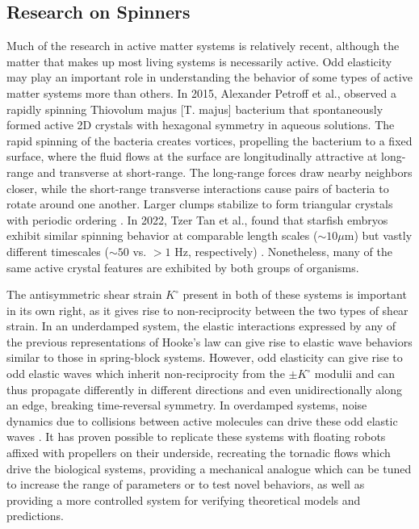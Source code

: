 \subsection*{Research on Spinners}
Much of the research in active matter systems is relatively recent, although the matter that makes up most living systems is necessarily active.  Odd elasticity may play an important role in understanding the behavior of some types of active matter systems more than others.  In 2015, Alexander Petroff et al., observed a rapidly spinning Thiovolum majus [T. majus] bacterium that spontaneously formed active 2D crystals with hexagonal symmetry in aqueous solutions.  The rapid spinning of the bacteria creates vortices, propelling the bacterium to a fixed surface, where the fluid flows at the surface are longitudinally attractive at long-range and transverse at short-range.  The long-range forces draw nearby neighbors closer, while the short-range transverse interactions cause pairs of bacteria to rotate around one another.  Larger clumps stabilize to form triangular crystals with periodic ordering \cite{petroff2015fast}.  In 2022, Tzer Tan et al., found that starfish embryos exhibit similar spinning behavior at comparable length scales ($\sim 10 \mu$m) but vastly different timescales ($\sim 50$ vs. $>1$ Hz, respectively) \cite{petroff2015fast, tan2022odd}.  Nonetheless, many of the same active crystal features are exhibited by both groups of organisms.

The antisymmetric shear strain $K^\circ$ present in both of these systems is important in its own right, as it gives rise to non-reciprocity between the two types of shear strain.  In an underdamped system, the elastic interactions expressed by any of the previous representations of Hooke's law can give rise to elastic wave behaviors similar to those in spring-block systems\cite{Shankar2019prx, tan2022odd, bililign2022motile, huang2025anomalous}.  However, odd elasticity can give rise to odd elastic waves which inherit non-reciprocity from the $\pm K^\circ$ modulii and can thus propagate differently in different directions and even unidirectionally along an edge, breaking time-reversal symmetry.  In overdamped systems, noise dynamics due to collisions between active molecules can drive these odd elastic waves \cite{choi2024noise}.  It has proven possible to replicate these systems with floating robots affixed with propellers on their underside, recreating the tornadic flows which drive the biological systems, providing a mechanical analogue which can be tuned to increase the range of parameters or to test novel behaviors, as well as providing a more controlled system for verifying theoretical models and predictions.

